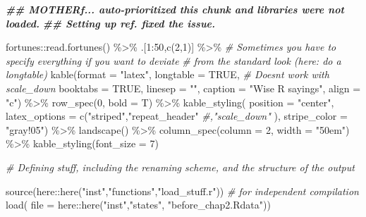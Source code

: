 \documentclass[
]{article}
\newenvironment{Shaded}{\begin{snugshade}}{\end{snugshade}}
\newcommand{\AttributeTok}[1]{\textcolor[rgb]{0.77,0.63,0.00}{#1}}
\newcommand{\CommentTok}[1]{\textcolor[rgb]{0.56,0.35,0.01}{\textit{#1}}}
\newcommand{\ConstantTok}[1]{\textcolor[rgb]{0.00,0.00,0.00}{#1}}
\newcommand{\DecValTok}[1]{\textcolor[rgb]{0.00,0.00,0.81}{#1}}
\newcommand{\DocumentationTok}[1]{\textcolor[rgb]{0.56,0.35,0.01}{\textbf{\textit{#1}}}}
\newcommand{\FunctionTok}[1]{\textcolor[rgb]{0.00,0.00,0.00}{#1}}
\newcommand{\NormalTok}[1]{#1}
\newcommand{\SpecialCharTok}[1]{\textcolor[rgb]{0.00,0.00,0.00}{#1}}
\newcommand{\StringTok}[1]{\textcolor[rgb]{0.31,0.60,0.02}{#1}}
\begin{document}
\begin{Shaded}
\begin{Highlighting}[]
\DocumentationTok{\#\# MOTHERf... auto{-}prioritized this chunk and libraries were not loaded. }
\DocumentationTok{\#\# Setting up ref. fixed the issue.}

\NormalTok{fortunes}\SpecialCharTok{::}\FunctionTok{read.fortunes}\NormalTok{() }\SpecialCharTok{\%\textgreater{}\%} 
\NormalTok{  .[}\DecValTok{1}\SpecialCharTok{:}\DecValTok{50}\NormalTok{,}\FunctionTok{c}\NormalTok{(}\DecValTok{2}\NormalTok{,}\DecValTok{1}\NormalTok{)] }\SpecialCharTok{\%\textgreater{}\%}
  \CommentTok{\# Sometimes you have to specify everything if you want to deviate}
  \CommentTok{\# from the standard look (here: do a longtable)}
  \FunctionTok{kable}\NormalTok{(}\AttributeTok{format =} \StringTok{"latex"}\NormalTok{, }
                    \AttributeTok{longtable =} \ConstantTok{TRUE}\NormalTok{, }\CommentTok{\# Doesn\textquotesingle{}t work with scale\_down}
                    \AttributeTok{booktabs =} \ConstantTok{TRUE}\NormalTok{,}
                    \AttributeTok{linesep =} \StringTok{""}\NormalTok{,}
                    \AttributeTok{caption =} \StringTok{"Wise R sayings"}\NormalTok{,}
                    \AttributeTok{align =} \StringTok{"c"}\NormalTok{) }\SpecialCharTok{\%\textgreater{}\%}
  \FunctionTok{row\_spec}\NormalTok{(}\DecValTok{0}\NormalTok{, }\AttributeTok{bold =}\NormalTok{ T) }\SpecialCharTok{\%\textgreater{}\%}
  \FunctionTok{kable\_styling}\NormalTok{( }\AttributeTok{position =} \StringTok{"center"}\NormalTok{,}
                 \AttributeTok{latex\_options =} \FunctionTok{c}\NormalTok{(}\StringTok{"striped"}\NormalTok{,}\StringTok{"repeat\_header"}
                                   \CommentTok{\#,"scale\_down"}
\NormalTok{                                   ),}
                 \AttributeTok{stripe\_color =} \StringTok{"gray!05"}\NormalTok{) }\SpecialCharTok{\%\textgreater{}\%}
  \FunctionTok{landscape}\NormalTok{() }\SpecialCharTok{\%\textgreater{}\%}
  \FunctionTok{column\_spec}\NormalTok{(}\AttributeTok{column =} \DecValTok{2}\NormalTok{, }\AttributeTok{width =} \StringTok{"50em"}\NormalTok{) }\SpecialCharTok{\%\textgreater{}\%}
  \FunctionTok{kable\_styling}\NormalTok{(}\AttributeTok{font\_size =} \DecValTok{7}\NormalTok{)}



\CommentTok{\# Defining stuff, including the renaming scheme, and the structure of the output}


\FunctionTok{source}\NormalTok{(here}\SpecialCharTok{::}\FunctionTok{here}\NormalTok{(}\StringTok{"inst"}\NormalTok{,}\StringTok{"functions"}\NormalTok{,}\StringTok{"load\_stuff.r"}\NormalTok{)) }\CommentTok{\# for independent compilation}
\FunctionTok{load}\NormalTok{( }\AttributeTok{file =}\NormalTok{ here}\SpecialCharTok{::}\FunctionTok{here}\NormalTok{(}\StringTok{"inst"}\NormalTok{,}\StringTok{"states"}\NormalTok{, }\StringTok{"before\_chap2.Rdata"}\NormalTok{))}


\end{Highlighting}
\end{Shaded}
\end{document}
